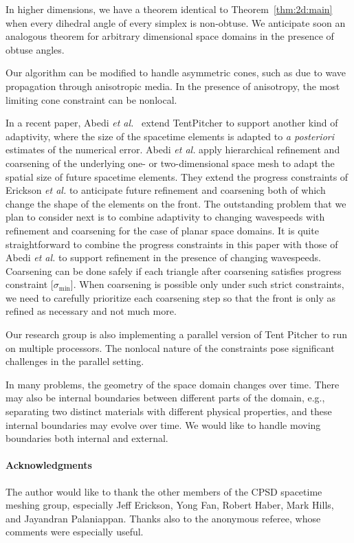 \documentclass[twocolumn]{article}
\def\S{\ensuremath{\sigma}}
\def\minS{\ensuremath{\S_{\text{min}}}}
\def\etal{\textsl{et al.}}
\def\aposteriori{\textsl{a posteriori}}
\begin{document}
In higher dimensions, we have a theorem identical to
Theorem~\ref{thm:2d:main} when every dihedral angle of every simplex
is non-obtuse.  We anticipate soon an analogous theorem for arbitrary
dimensional space domains in the presence of obtuse angles.

Our algorithm can be modified to handle asymmetric cones, such as due
to wave propagation through anisotropic media.  In the presence of
anisotropy, the most limiting cone constraint can be nonlocal.

In a recent paper, Abedi \etal{}~\cite{abedi04spacetime} extend
TentPitcher to support another kind of adaptivity, where the size of
the spacetime elements is adapted to \aposteriori{} estimates of the
numerical error.  Abedi \etal{} apply hierarchical refinement and
coarsening of the underlying one- or two-dimensional space mesh to
adapt the spatial size of future spacetime elements.  They extend the
progress constraints of Erickson \etal{} to anticipate future
refinement and coarsening both of which change the shape of the
elements on the front.  The outstanding problem that we plan to
consider next is to combine adaptivity to changing wavespeeds with
refinement and coarsening for the case of planar space domains.  It is
quite straightforward to combine the progress constraints in this
paper with those of Abedi \etal{} to support refinement in the
presence of changing wavespeeds.  Coarsening can be done safely if
each triangle after coarsening satisfies progress constraint
[$\minS$].  When coarsening is possible only under such strict
constraints, we need to carefully prioritize each coarsening step so
that the front is only as refined as necessary and not much more.

Our research group is also implementing a parallel version of Tent
Pitcher to run on multiple processors.  The nonlocal nature of the
constraints pose significant challenges in the parallel setting.

In many problems, the geometry of the space domain changes over time.
There may also be internal boundaries between different parts of the
domain, e.g., separating two distinct materials with different
physical properties, and these internal boundaries may evolve over
time.  We would like to handle moving boundaries both internal and
external.




\paragraph{Acknowledgments}

The author would like to thank the other members of the CPSD spacetime
meshing group, especially Jeff Erickson, Yong Fan, Robert Haber, Mark
Hills, and Jayandran Palaniappan.  Thanks also to the anonymous
referee, whose comments were especially useful.





\end{document}
